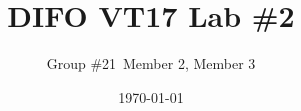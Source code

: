 \documentclass{article}
\title{DIFO VT17 Lab \#2}
\author{Group \#21\, Member 2, Member 3}
\date{\today} %
\begin{document}
\maketitle
\thispagestyle{empty} %
\pagestyle{empty} %
\clearpage

\tableofcontents
\clearpage

\setcounter{page}{1}

\pagestyle{fancy}









\clearpage
\printbibliography
\clearpage




\lhead{}
\rhead{}

\begin{appendix}


\clearpage

\clearpage
\end{appendix}
\end{document}
